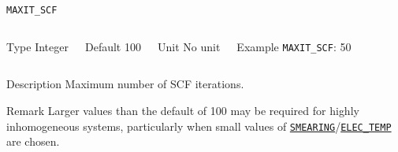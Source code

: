 \documentclass[xcolor=dvipsnames,t]{beamer}
\begin{document}
\begin{frame}[allowframebreaks]{\texttt{{MAXIT\_SCF}}} \label{MAXIT_SCF}
\vspace*{-12pt}
\begin{columns}
\begin{block}{Type}
Integer
\end{block}

\begin{block}{Default}
100
\end{block}

\begin{block}{Unit}
No unit
\end{block}

\begin{block}{Example}
\texttt{MAXIT\_SCF}: 50
\end{block}
\end{columns}

\begin{block}{Description}
Maximum number of SCF iterations.
\end{block}

\begin{block}{Remark}
Larger values than the default of 100 may be required for highly inhomogeneous systems, particularly when small values of \hyperlink{SMEARING}{\texttt{SMEARING}}/\hyperlink{ELEC_TEMP}{\texttt{ELEC\_TEMP}} are chosen. 
\end{block}

\end{frame}
\end{document}

